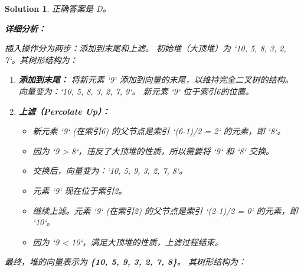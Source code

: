 \documentclass[UTF8]{report}
\newtheorem{solution}{Solution}
\theoremstyle{MyLineTheoremStyle} %
\theoremstyle{MyBlockTheoremStyle} %
\theoremstyle{MySubsubsectionStyle} %
\begin{document}
\begin{solution}
正确答案是 D。

\textbf{详细分析：}

插入操作分为两步：添加到末尾和上滤。
初始堆（大顶堆）为 `{10, 5, 8, 3, 2, 7}`。其树形结构为：
\begin{center}
\end{center}

\begin{enumerate}
    \item \textbf{添加到末尾：}
    将新元素 `9` 添加到向量的末尾，以维持完全二叉树的结构。
    向量变为：`{10, 5, 8, 3, 2, 7, 9}`。
    新元素 `9` 位于索引6的位置。

    \item \textbf{上滤（Percolate Up）：}
    \begin{itemize}
        \item 新元素 `9` (在索引6) 的父节点是索引 `(6-1)/2 = 2` 的元素，即 `8`。
        \item 因为 `9 > 8`，违反了大顶堆的性质，所以需要将 `9` 和 `8` 交换。
        \item 交换后，向量变为：`{10, 5, 9, 3, 2, 7, 8}`。
        \item 元素 `9` 现在位于索引2。
    \end{itemize}
    \begin{itemize}
        \item 继续上滤。元素 `9` (在索引2) 的父节点是索引 `(2-1)/2 = 0` 的元素，即 `10`。
        \item 因为 `9 < 10`，满足大顶堆的性质，上滤过程结束。
    \end{itemize}
\end{enumerate}

最终，堆的向量表示为 \textbf{\{10, 5, 9, 3, 2, 7, 8\}}。
其树形结构为：
\begin{center}
\end{center}
\end{solution}
\end{document}

